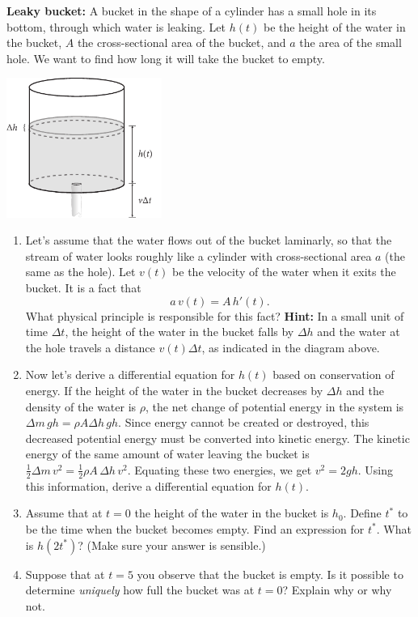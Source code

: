 \documentclass[12pt,letterpaper]{hmcpset}
\begin{document}
\begin{problem}[1]
    {\textbf{Leaky bucket:} A bucket in the shape of a cylinder has a
        small hole in its bottom, through which water is leaking. Let $h(t)$ be the height
        of the water in the bucket, $A$ the
        cross-sectional area of the bucket, and $a$ the area of the small
        hole. We want to find how long it will take the bucket to
    empty.}
    \begin{center}
        \includegraphics[width=2in]{img/bucket}
    \end{center}
    \begin{enumerate}
        \item Let's assume that the water flows out of the
            bucket laminarly, so that the stream of water looks roughly like a
            cylinder with cross-sectional area $a$ (the same as the hole). Let
            $v(t)$ be the velocity of the water when it exits the bucket. It
            is a fact that
            \[
                a\,v(t)=A\,h'(t).
            \]
            What physical principle is responsible for this fact?
            \textbf{Hint:} In a small unit of time $\Delta t$, the height of the
            water in the bucket falls by $\Delta h$ and the water at the hole
            travels a distance $v(t)\Delta t$, as indicated in the diagram above.
        \item Now let's derive a differential equation for $h(t)$ based on
            conservation of energy. If the height of the water in the bucket
            decreases by $\Delta h$ and the density of the water is $\rho$, the
            net change of potential energy in the system is $\Delta m\, gh=\rho
            A\Delta h\, gh$. Since energy cannot be created or destroyed,
            this decreased potential energy must be converted into kinetic energy.
            The kinetic energy of the same amount of water leaving the bucket is
            $\tfrac{1}{2} \Delta m\, v^2=\tfrac{1}{2}\rho A\, \Delta h\, v^2$.
            Equating these two energies, we get $v^2=2gh$. Using this
            information, derive a differential equation for $h(t)$.
        \item Assume that at $t=0$ the height of the water in the bucket is
            $h_0$. Define $t^{\ast}$ to be the time when the bucket becomes
            empty. Find an expression for $t^{\ast}$.  What is $h(2t^{\ast})$?
            (Make sure your answer is sensible.)\newpage
        \item Suppose that at $t=5$ you observe that the bucket is empty. Is
            it possible to determine \textit{uniquely} how full the bucket was
            at $t=0$? Explain why or why not.
    \end{enumerate}
\end{problem}
\end{document}
